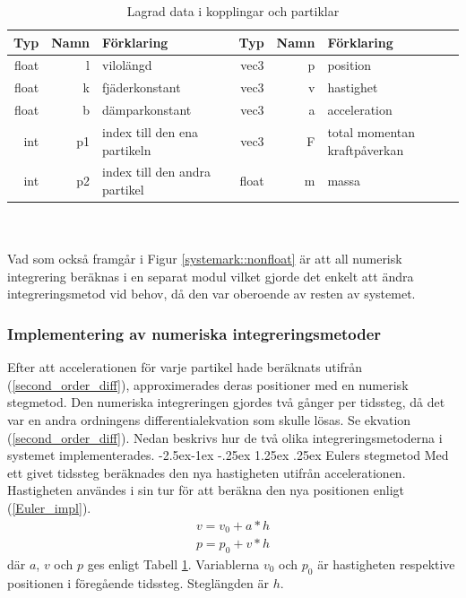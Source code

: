 \documentclass[a4paper,12pt,oneside,final,swedish]{extarticle}
\makeatletter
\renewcommand\paragraph{\@startsection{paragraph}{4}{\z@}%
            {-2.5ex\@plus -1ex \@minus -.25ex}%
            {1.25ex \@plus .25ex}%
            {\normalfont\normalsize\bfseries}}
\makeatother
\begin{document}
\begin{table}[h!]
  \centering
  \caption{Lagrad data i kopplingar och partiklar}
  \begin{tabular}{| r r l | r r l |}
    \hline
     Typ & Namn & Förklaring & Typ & Namn & Förklaring\\
    \hline
    float & l & vilolängd & vec3 & p & position\\ 
    float & k & fjäderkonstant & vec3 & v & hastighet\\ 
    float & b & dämparkonstant & vec3 & a & acceleration\\ 
    int & p1 & index till den ena partikeln & vec3 & F & total momentan kraftpåverkan\\ 
    int & p2 & index till den andra partikel & float & m & massa \\
    \hline
    \end{tabular}
  \label{table_ark} %
\end{table}
\\\\
Vad som också framgår i Figur \ref{systemark::nonfloat} är att all numerisk integrering beräknas i en separat modul vilket gjorde det enkelt att ändra integreringsmetod vid behov, då den var oberoende av resten av systemet.

\subsubsection{Implementering av numeriska integreringsmetoder}
Efter att accelerationen för varje partikel hade beräknats utifrån (\ref{second_order_diff}), approximerades deras positioner med en numerisk stegmetod. Den numeriska integreringen gjordes två gånger per tidssteg, då det var en andra ordningens differentialekvation som skulle lösas. Se ekvation (\ref{second_order_diff}). Nedan beskrivs hur de två olika integreringsmetoderna i systemet implementerades.
\paragraph{Eulers stegmetod} 
Med ett givet tidssteg beräknades den nya hastigheten utifrån accelerationen. Hastigheten användes i sin tur för att beräkna den nya positionen enligt (\ref{Euler_impl}).
	\begin{equation}
	\begin{split} 
	v = v_0 + a*h\\
	p = p_0 + v*h
	\end{split} 
	\label{Euler_impl}
	\end{equation}
där $a$, $v$ och $p$ ges enligt Tabell \ref{table_ark}. Variablerna $v_0$ och $p_0$ är hastigheten respektive positionen i föregående tidssteg. Steglängden är $h$.
\end{document}
